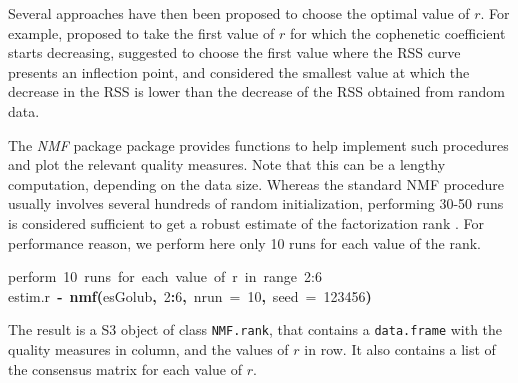 \documentclass[a4paper]{article}\usepackage{graphicx, color}
\makeatletter
\newcommand{\hlnumber}[1]{\textcolor[rgb]{0,0,0}{#1}}%
\newcommand{\hlfunctioncall}[1]{\textcolor[rgb]{0.501960784313725,0,0.329411764705882}{\textbf{#1}}}%
\newcommand{\hlkeyword}[1]{\textcolor[rgb]{0,0,0}{\textbf{#1}}}%
\newcommand{\hlargument}[1]{\textcolor[rgb]{0.690196078431373,0.250980392156863,0.0196078431372549}{#1}}%
\newcommand{\hlcomment}[1]{\textcolor[rgb]{0.180392156862745,0.6,0.341176470588235}{#1}}%
\newcommand{\hlassignement}[1]{\textcolor[rgb]{0,0,0}{\textbf{#1}}}%
\newcommand{\hlsymbol}[1]{\textcolor[rgb]{0,0,0}{#1}}%
\newcommand{\hlstd}[1]{\textcolor[rgb]{0,0,0}{#1}}%
\newenvironment{kframe}{%
 \def\FrameCommand##1{\hskip\@totalleftmargin \hskip-\fboxsep
 \colorbox{shadecolor}{##1}\hskip-\fboxsep
     \hskip-\linewidth \hskip-\@totalleftmargin \hskip\columnwidth}%
 \MakeFramed {\advance\hsize-\width
   \@totalleftmargin\z@ \linewidth\hsize
   \@setminipage}}%
 {\par\unskip\endMakeFramed}
\newenvironment{knitrout}{}{} %
\let\code=\texttt
\newcommand{\pkgname}[1]{\textit{#1}\xspace}
\newcommand{\Rpkg}[1]{\pkgname{#1} package\xspace}
\newcommand{\nmfpack}{\Rpkg{NMF}}
\makeatother
\begin{document}
Several approaches have then been proposed to choose the optimal value of $r$.
For example, \cite{Brunet2004} proposed to take the first value of $r$ for which the cophenetic coefficient starts decreasing, \cite{Hutchins2008} suggested to choose the first value where the RSS curve presents an inflection point, and \cite{Frigyesi2008} considered the smallest value at which the decrease in the RSS is lower than the decrease of the RSS obtained from random data.

The \nmfpack package provides functions to help implement such procedures and plot the relevant quality measures.
Note that this can be a lengthy computation, depending on the data size.
Whereas the standard NMF procedure usually involves several hundreds of random initialization, performing 30-50 runs is considered sufficient to get a robust estimate of the factorization rank \cite{Brunet2004, Hutchins2008}.
For performance reason, we perform here only 10 runs for each value of the rank.

\begin{knitrout}
\color{fgcolor}\begin{kframe}
\begin{flushleft}
\ttfamily\noindent
\hlcomment{\usebox{\hlnormalsizeboxhash}{\ }perform{\ }10{\ }runs{\ }for{\ }each{\ }value{\ }of{\ }r{\ }in{\ }range{\ }2:6}\hspace*{\fill}\\
\hlstd{}\hlsymbol{estim.r}{\ }\hlassignement{\usebox{\hlnormalsizeboxlessthan}-}{\ }\hlfunctioncall{nmf}\hlkeyword{(}\hlsymbol{esGolub}\hlkeyword{,}{\ }\hlnumber{2}\hlkeyword{:}\hlnumber{6}\hlkeyword{,}{\ }\hlargument{nrun}{\ }\hlargument{=}{\ }\hlnumber{10}\hlkeyword{,}{\ }\hlargument{seed}{\ }\hlargument{=}{\ }\hlnumber{123456}\hlkeyword{)}\mbox{}
\normalfont
\end{flushleft}
\end{kframe}
\end{knitrout}


The result is a S3 object of class \code{NMF.rank}, that contains a \code{data.frame} with the quality measures in column, and the values of $r$ in row.
It also contains a list of the consensus matrix for each value of $r$.
\end{document}
